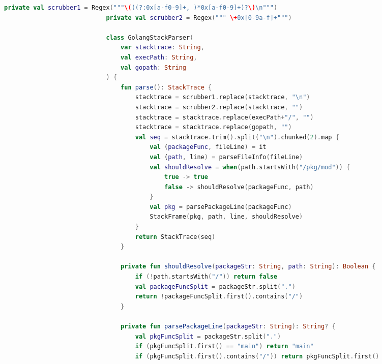 \documentclass[12pt,pdftex,titlepage]{report}
\begin{document}
                    \begin{spacing}{1.0}
                        \begin{lstlisting}[language=Kotlin, gobble=28, label={lst:goparser}]
                            private val scrubber1 = Regex("""\(((?:0x[a-f0-9]+, )*0x[a-f0-9]+)?\)\n""")
                            private val scrubber2 = Regex(""" \+0x[0-9a-f]+""")
                            
                            class GolangStackParser(
                                var stacktrace: String,
                                val execPath: String,
                                val gopath: String
                            ) {
                                fun parse(): StackTrace {
                                    stacktrace = scrubber1.replace(stacktrace, "\n")
                                    stacktrace = scrubber2.replace(stacktrace, "")
                                    stacktrace = stacktrace.replace(execPath+"/", "")
                                    stacktrace = stacktrace.replace(gopath, "")
                                    val seq = stacktrace.trim().split("\n").chunked(2).map {
                                        val (packageFunc, fileLine) = it
                                        val (path, line) = parseFileInfo(fileLine) 
                                        val shouldResolve = when(path.startsWith("/pkg/mod")) {
                                            true -> true
                                            false -> shouldResolve(packageFunc, path)
                                        } 
                                        val pkg = parsePackageLine(packageFunc)
                                        StackFrame(pkg, path, line, shouldResolve)
                                    }
                                    return StackTrace(seq)
                                }
                            
                                private fun shouldResolve(packageStr: String, path: String): Boolean {
                                    if (!path.startsWith("/")) return false
                                    val packageFuncSplit = packageStr.split(".")
                                    return !packageFuncSplit.first().contains("/")
                                }
                            
                                private fun parsePackageLine(packageStr: String): String? {
                                    val pkgFuncSplit = packageStr.split(".")
                                    if (pkgFuncSplit.first() == "main") return "main"
                                    if (pkgFuncSplit.first().contains("/")) return pkgFuncSplit.first()


\end{lstlisting}
\end{spacing}
\end{document}

